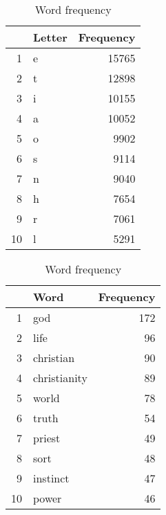 \documentclass[letterpaper, 10 pt, conference]{article}
\begin{document}
\begin{table}[t]
	\caption{Word and character frequency}
	\begin{subtable}{0.45\textwidth}
		\centering
		\caption{Character frequency}
		\begin{tabular}{rlr}
			\hline
			& Letter & Frequency \\ 
			\hline
			1 & e & 15765 \\ 
			2 & t & 12898 \\ 
			3 & i & 10155 \\ 
			4 & a & 10052 \\ 
			5 & o & 9902 \\ 
			6 & s & 9114 \\ 
			7 & n & 9040 \\ 
			8 & h & 7654 \\ 
			9 & r & 7061 \\ 
			10 & l & 5291 \\ 
			\hline
		\end{tabular}
	\end{subtable}
	\hfill
	\begin{subtable}{0.45\textwidth}
		\centering
		\caption{Word frequency}
		\begin{tabular}{rlr}
			\hline
			& Word & Frequency \\ 
			\hline
			1 & god & 172 \\ 
			2 & life &  96 \\ 
			3 & christian &  90 \\ 
			4 & christianity &  89 \\ 
			5 & world &  78 \\ 
			6 & truth &  54 \\ 
			7 & priest &  49 \\ 
			8 & sort &  48 \\ 
			9 & instinct &  47 \\ 
			10 & power &  46 \\ 
			\hline
		\end{tabular}
	\end{subtable}
	\label{tab:words-chars}
\end{table}
\end{document}
